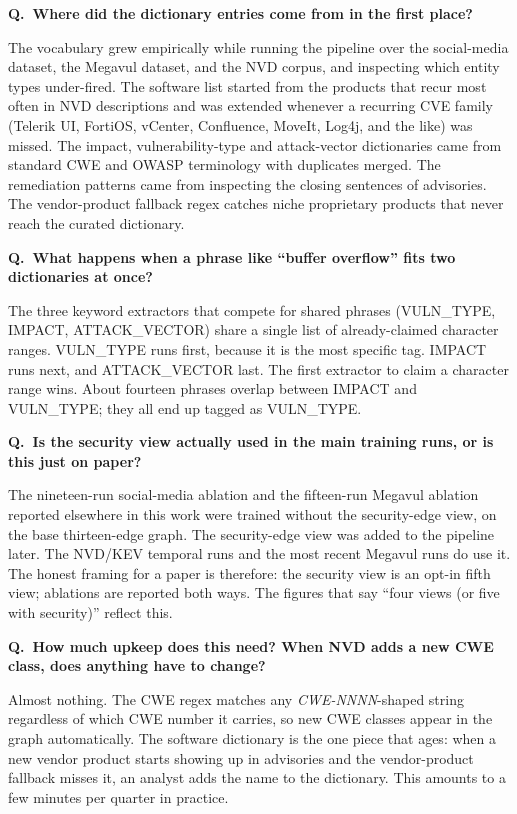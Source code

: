 \documentclass[11pt,a4paper]{article}
\newenvironment{question}[1]{%
    \par\smallskip
    \noindent\textcolor{accent}{\bfseries Q.\ #1}\par\nopagebreak
    \smallskip\noindent\ignorespaces
}{\par\medskip}
\begin{document}
\begin{question}{Where did the dictionary entries come
    from in the first place?}
The vocabulary grew empirically while running the pipeline
over the social-media dataset, the Megavul dataset, and
the NVD corpus, and inspecting which entity types
under-fired. The software list started
from the products that recur most often in NVD descriptions
and was extended whenever a recurring CVE family (Telerik
UI, FortiOS, vCenter, Confluence, MoveIt, Log4j, and the
like) was missed. The impact, vulnerability-type and
attack-vector dictionaries came from standard CWE and OWASP
terminology with duplicates merged. The remediation
patterns came from inspecting the closing sentences of
advisories. The vendor-product fallback regex catches niche
proprietary products that never reach the curated
dictionary.
\end{question}

\begin{question}{What happens when a phrase like ``buffer
    overflow'' fits two dictionaries at once?}
The three keyword extractors that compete for shared
phrases (VULN\_TYPE, IMPACT, ATTACK\_VECTOR) share a single
list of already-claimed character ranges. VULN\_TYPE runs
first, because it is the most specific tag. IMPACT runs
next, and ATTACK\_VECTOR last. The first extractor to claim
a character range wins. About fourteen phrases overlap
between IMPACT and VULN\_TYPE; they all end up tagged as
VULN\_TYPE.
\end{question}

\begin{question}{Is the security view actually used in the
    main training runs, or is this just on paper?}
The nineteen-run social-media ablation and the fifteen-run
Megavul ablation reported elsewhere in this work were
trained without the security-edge view, on the base
thirteen-edge graph. The security-edge view was added to
the pipeline later. The NVD/KEV temporal runs and the most
recent Megavul runs do use it. The honest framing for a
paper is therefore: the security view is an opt-in fifth
view; ablations are reported both ways. The figures that
say ``four views (or five with security)'' reflect this.
\end{question}

\begin{question}{How much upkeep does this need? When NVD
    adds a new CWE class, does anything have to change?}
Almost nothing. The CWE regex matches any
\emph{CWE-NNNN}-shaped string regardless of which CWE
number it carries, so new CWE classes appear in the graph
automatically. The software dictionary is the one piece
that ages: when a new vendor product starts showing up in
advisories and the vendor-product fallback misses it, an
analyst adds the name to the dictionary. This amounts to a
few minutes per quarter in practice.
\end{question}
\end{document}
